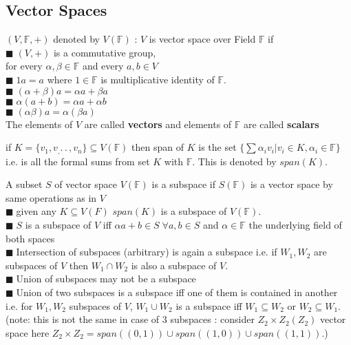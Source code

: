 \documentclass[11pt]{extarticle}
\newcommand{\F}{\mathbb{F}}
\newcommand{\ck}{.\,.\,}
\newcommand{\snote}[1]{{\footnotesize(#1)}}
\newcommand{\tm}{\times}
\newcommand{\tbx}[2][]{
	\begin{tcolorbox}[enhanced,breakable,size=small,colback=black!2!white,title={#1},arc is angular, arc=1.5mm,drop fuzzy shadow]
		#2
	\end{tcolorbox}
}
\newcommand{\yi}{\\$\blacksquare\;$}
\begin{document}
\begin{multicols}{2}
	\section{Vector Spaces}
	\tbx[Definition]{$ (V,\F,+) $ denoted by $ V(\F) $   : $ V $ is vector space over Field $ \F $ if 
	\yi $ (V,+) $ is a commutative group, \\
	for every $ \alpha,\beta \in \F$ and every  $ a,b\in V $ 
	\yi $ 1a=a $ where $ 1\in \F $ is multiplicative identity of $ \F. $ 
	\yi $ (\alpha+\beta)a=\alpha a+\beta a $ 
	\yi $ \alpha (a+b)=\alpha a+\alpha b $ 
	\yi $ (\alpha\beta)a=\alpha(\beta a) $ \\
	The elements of $ V $ are called \textbf{vectors }and elements of $ \F $ are called \textbf{scalars}}
	\tbx[Span]{ if $ K=\{v_1,v_,\ck, v_n\} \subseteq V(\F)$ then span of $ K$ is the set $ \{\sum \alpha_iv_i| v_i \in K, \alpha_i \in \F\} $ i.e. is all the formal sums from set $ K $ with $ \F. $ This is denoted by $ span(K).$ 
		 }
	\tbx[Subspace]{ A subset $ S $ of vector space $ V(\F)$ is a subspace if $ S(\F) $ is a vector space by same operations as in $ V $ 
	\yi given any $ K\subseteq V(F) $ $ span(K) $ is a subspace of $ V(\F) .$
	\yi $ S $ is a subspace of $ V $ iff $ \alpha a+b \in S\; \forall a,b\in S $ and $ \alpha\in \F $ the underlying field of both spaces  
	\yi Intersection of subspaces (arbitrary) is again a subspace i.e. if $ W_1,W_2 $ are subspaces of $ V $ then
	$ W_1\cap W_2 $ is also a subspace of $ V $.
	\yi Union of subspaces may not be a subspace
	\yi Union of two subspaces is a subspace iff one of them is contained in another i.e. for  $ W_1,W_2 $ subspaces of $ V $, $ W_1\cup W_2 $ is a subspace iff $ W_1\subseteq W_2 $ or $ W_2\subseteq W_1. $\\ \snote{note: this is not the same in case of $ 3 $ subspaces : consider $ Z_2\tm Z_2 (Z_2) $ vector space here  $ Z_2\tm Z_2=span((0,1))\cup span((1,0))\cup span((1,1)) $.} }


\end{multicols}
\end{document}
